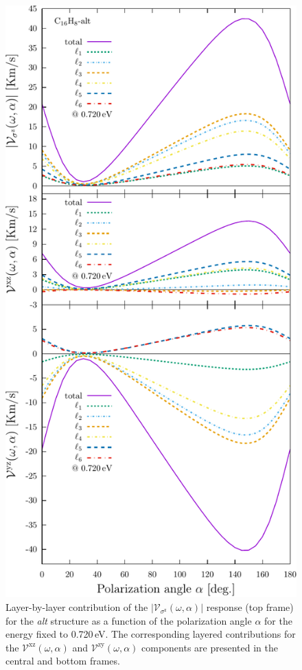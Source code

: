 \documentclass[prb,11pt,tightenlines,twocolumn,aps]{revtex4-1}
\begin{document}
\begin{figure}[t]
    \centering
    \includegraphics[width=\linewidth]{altplots/alt-svaz-lay-1}
    
\caption{Layer-by-layer contribution of the
    $|\mathcal{V}_{\sigma^{\mathrm{z}}}(\omega,\alpha)|$ response (top frame)
    for the \emph{alt} structure as a function of the polarization angle
    $\alpha$ for the energy fixed to 0.720\,eV.
    The corresponding layered contributions for the
    $\mathcal{V}^{\mathrm{xz}}(\omega,\alpha)$ and
    $\mathcal{V}^{\mathrm{zy}}(\omega,\alpha)$ components are presented in the
    central and bottom frames.}
    \label{fig:alt-vsz-lay}
\end{figure}
% 
\end{document}
